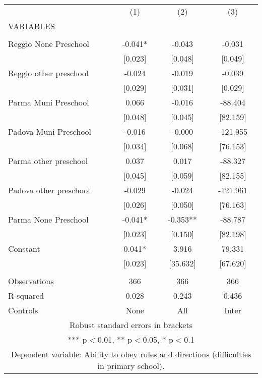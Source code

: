 \begin{tabular}{lccc} \hline
 & (1) & (2) & (3) \\
VARIABLES &  &  &  \\ \hline
 &  &  &  \\
Reggio None Preschool & -0.041* & -0.043 & -0.031 \\
 & [0.023] & [0.048] & [0.049] \\
Reggio other preschool & -0.024 & -0.019 & -0.039 \\
 & [0.029] & [0.031] & [0.029] \\
Parma Muni Preschool & 0.066 & -0.016 & -88.404 \\
 & [0.048] & [0.045] & [82.159] \\
Padova Muni Preschool & -0.016 & -0.000 & -121.955 \\
 & [0.034] & [0.068] & [76.153] \\
Parma other preschool & 0.037 & 0.017 & -88.327 \\
 & [0.045] & [0.059] & [82.155] \\
Padova other preschool & -0.029 & -0.024 & -121.961 \\
 & [0.026] & [0.050] & [76.163] \\
Parma None Preschool & -0.041* & -0.353** & -88.787 \\
 & [0.023] & [0.150] & [82.198] \\
Constant & 0.041* & 3.916 & 79.331 \\
 & [0.023] & [35.632] & [67.620] \\
 &  &  &  \\
Observations & 366 & 366 & 366 \\
R-squared & 0.028 & 0.243 & 0.436 \\
 Controls & None & All & Inter \\ \hline
\multicolumn{4}{c}{ Robust standard errors in brackets} \\
\multicolumn{4}{c}{ *** p$<$0.01, ** p$<$0.05, * p$<$0.1} \\
\multicolumn{4}{c}{ Dependent variable: Ability to obey rules and directions (difficulties in primary school).} \\
\end{tabular}
